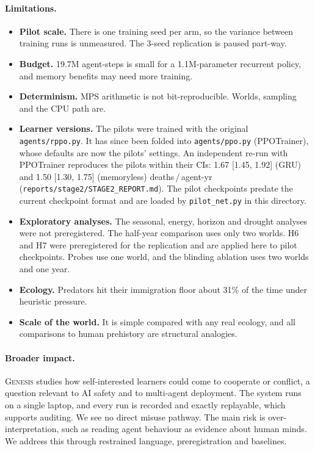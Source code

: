 \documentclass[10pt]{article}
\newcommand{\genesis}{\textsc{Genesis}}
\newcommand{\dpay}{deaths\,/\,agent-yr}
\begin{document}
\paragraph{Limitations.}
\begin{itemize}
\item \textbf{Pilot scale.} There is one training seed per arm, so the variance between training runs is unmeasured.
The 3-seed replication is paused part-way.
\item \textbf{Budget.} 19.7M agent-steps is small for a 1.1M-parameter recurrent policy, and memory benefits may
need more training.
\item \textbf{Determinism.} MPS arithmetic is not bit-reproducible. Worlds, sampling and the CPU path are.
\item \textbf{Learner versions.} The pilots were trained with the original \texttt{agents/rppo.py}. It has since
been folded into \texttt{agents/ppo.py} (PPOTrainer), whose defaults are now the pilots' settings. An independent
re-run with PPOTrainer reproduces the pilots within their CIs: 1.67 [1.45, 1.92] (GRU) and 1.50 [1.30, 1.75]
(memoryless) \dpay{} (\texttt{reports/stage2/STAGE2\_REPORT.md}). The pilot checkpoints predate the current
checkpoint format and are loaded by \texttt{pilot\_net.py} in this directory.
\item \textbf{Exploratory analyses.} The seasonal, energy, horizon and drought analyses were not preregistered. The
half-year comparison uses only two worlds. H6 and H7 were preregistered for the replication and are applied here
to pilot checkpoints. Probes use one world, and the blinding ablation uses two worlds and one year.
\item \textbf{Ecology.} Predators hit their immigration floor about 31\% of the time under heuristic pressure.
\item \textbf{Scale of the world.} It is simple compared with any real ecology, and all comparisons to human
prehistory are structural analogies.
\end{itemize}

\paragraph{Broader impact.}
\genesis{} studies how self-interested learners could come to cooperate or conflict, a question relevant to AI
safety and to multi-agent deployment. The system runs on a single laptop, and every run is recorded and exactly
replayable, which supports auditing. We see no direct misuse pathway. The main risk is over-interpretation, such as
reading agent behaviour as evidence about human minds. We address this through restrained language, preregistration
and baselines.
\end{document}
